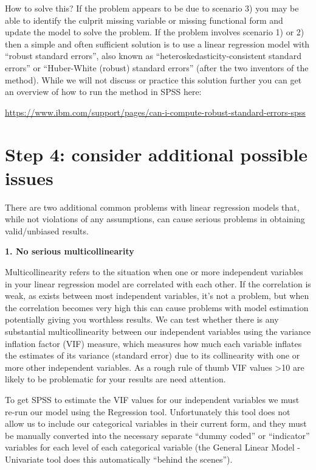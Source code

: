 \documentclass[
]{book}
\begin{document}
How to solve this? If the problem appears to be due to scenario 3) you may be able to identify the culprit missing variable or missing functional form and update the model to solve the problem. If the problem involves scenario 1) or 2) then a simple and often sufficient solution is to use a linear regression model with ``robust standard errors'', also known as ``heteroskedasticity-consistent standard errors'' or ``Huber-White (robust) standard errors'' (after the two inventors of the method). While we will not discuss or practice this solution further you can get an overview of how to run the method in SPSS here:

\url{https://www.ibm.com/support/pages/can-i-compute-robust-standard-errors-spss}

\hypertarget{step-4-consider-additional-possible-issues}{%
\section{Step 4: consider additional possible issues}\label{step-4-consider-additional-possible-issues}}

There are two additional common problems with linear regression models that, while not violations of any assumptions, can cause serious problems in obtaining valid/unbiased results.

\textbf{1. No serious multicollinearity}

Multicollinearity refers to the situation when one or more independent variables in your linear regression model are correlated with each other. If the correlation is weak, as exists between most independent variables, it's not a problem, but when the correlation becomes very high this can cause problems with model estimation potentially giving you worthless results. We can test whether there is any substantial multicollinearity between our independent variables using the variance inflation factor (VIF) measure, which measures how much each variable inflates the estimates of its variance (standard error) due to its collinearity with one or more other independent variables. As a rough rule of thumb VIF values \textgreater10 are likely to be problematic for your results are need attention.

To get SPSS to estimate the VIF values for our independent variables we must re-run our model using the Regression tool. Unfortunately this tool does not allow us to include our categorical variables in their current form, and they must be manually converted into the necessary separate ``dummy coded'' or ``indicator'' variables for each level of each categorical variable (the General Linear Model - Univariate tool does this automatically ``behind the scenes'').
\end{document}
